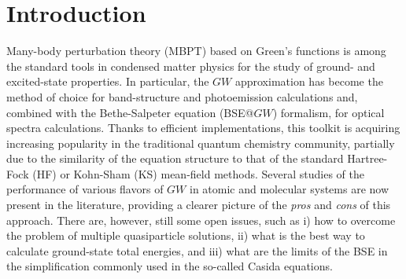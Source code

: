 \documentclass[aps,prb,reprint,superscriptaddress]{revtex4-1}
\begin{document}
\section{Introduction}
\label{sec:intro}
Many-body perturbation theory (MBPT) based on Green's functions is among the standard tools in condensed matter physics for the study of ground- and excited-state properties. \citep{Aryasetiawan_1998,Onida_2002,Martin_2016,Golze_2019} In particular, the $GW$ approximation \citep{Hedin_1965,Golze_2019} has become the method of choice for band-structure and photoemission calculations and, combined with the Bethe-Salpeter equation (BSE@$GW$) formalism, \citep{Salpeter_1951,Strinati_1988,Albrecht_1998,Rohlfing_1998,Benedict_1998,vanderHorst_1999,Blase_2018,Blase_2020} for optical spectra calculations. 
Thanks to efficient implementations, \citep{Duchemin_2019,Duchemin_2020,Duchemin_2021,Bruneval_2016,vanSetten_2013,Kaplan_2015, Kaplan_2016,Krause_2017,Caruso_2012,Caruso_2013,Caruso_2013a,Caruso_2013b,Wilhelm_2018} this toolkit is acquiring increasing popularity in the traditional quantum chemistry community, \citep{Rohlfing_1999a,Horst_1999,Puschnig_2002,Tiago_2003,Boulanger_2014,Jacquemin_2015a,Bruneval_2015,Jacquemin_2015b,Hirose_2015,Jacquemin_2017a,Jacquemin_2017b,Rangel_2017,Krause_2017,Gui_2018,Blase_2018,Liu_2020,Blase_2020,Holzer_2018a,Holzer_2018b,Loos_2020e} partially due to the similarity of the equation structure to that of the standard Hartree-Fock (HF) \citep{SzaboBook} or Kohn-Sham (KS) \citep{Hohenberg_1964,Kohn_1965} mean-field methods.  Several studies of the performance of various flavors of $GW$ in atomic and molecular systems are now present in the literature, \citep{Holm_PRB1998,Stan_2006,Stan_JCP2009,Blase_2011,Faber_2011,Bruneval_2012,Bruneval_2013,Bruneval_2015,Karlsson_PRB2016,Bruneval_2016, Bruneval_2016a,Boulanger_2014,Blase_2016,Li_2017,Hung_2016,Hung_2017,vanSetten_2015,vanSetten_2018,Ou_2016,Ou_2018,Faber_2014} providing a clearer picture of the \textit{pros} and \textit{cons} of this approach. There are, however, still some open issues, such as i) how to overcome the problem of multiple quasiparticle solutions, \citep{vanSetten_2015,Maggio_2017,Loos_2018,Veril_2018,Duchemin_2020,Loos_2020e} ii) what is the best way to calculate ground-state total energies, \citep{Casida_2005,Huix-Rotllant_2011,Caruso_2013,Casida_2016,Colonna_2014,Olsen_2014,Hellgren_2015,Holzer_2018b,Li_2019,Li_2020,Loos_2020e} and iii) what are the limits of the BSE in the simplification commonly used in the so-called Casida equations. \citep{Strinati_1988,Rohlfing_2000,Sottile_2003,Myohanen_2008,Ma_2009a,Ma_2009b,Romaniello_2009b,Sangalli_2011,Huix-Rotllant_2011,Sakkinen_2012,Zhang_2013,Rebolini_2016,Olevano_2019,Lettmann_2019,Loos_2020h,Authier_2020,Monino_2021}
\end{document}

